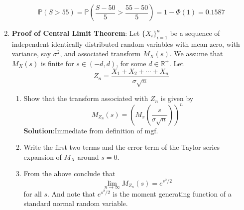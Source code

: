 \documentclass{article}
\newcommand{\Pb}{\mathbb{P}}
\newcommand{\Rb}{\mathbb{R}}
\newcommand{\soln}[1]{\textbf{Solution}:#1}
\newcommand{\bkt}[1]{\left(#1\right)}
\begin{document}
\begin{enumerate}
{		$$\Pb\bkt{S > 55} = \Pb \bkt{\dfrac{S-50}5 > \dfrac{55-50}5} = 1- \Phi(1) = 0.1587$$
		}
		\item
		\textbf{Proof of Central Limit Theorem}: Let $\{X_i\}_{i=1}^n$ be a sequence of independent identically distributed random variables with mean zero, with variance, say $\sigma^2$, and associated transform $M_X(s)$. We assume that $M_X(s)$ is finite for $s \in \bkt{-d,d}$, for some $d \in \Rb^+$. Let
		$$Z_n = \dfrac{X_1+X_2+\cdots+X_n}{\sigma \sqrt{n}}$$
		\begin{enumerate}
			\item
			Show that the transform associated with $Z_n$ is given by
			$$M_{Z_n}(s) = \bkt{M_x\bkt{\dfrac{s}{\sigma\sqrt{n}}}}^n$$
			\soln{Immediate from definition of mgf.}
			\item
			Write the first two terms and the error term of the Taylor series expansion of $M_X$ around $s=0$.
			\item
			From the above conclude that
			$$\lim_{n \to \infty} M_{Z_n}(s) = e^{s^2/2}$$
			for all $s$. And note that $e^{s^2/2}$ is the moment generating function of a standard normal random variable.
		\end{enumerate}
	\end{enumerate}
\end{document}
